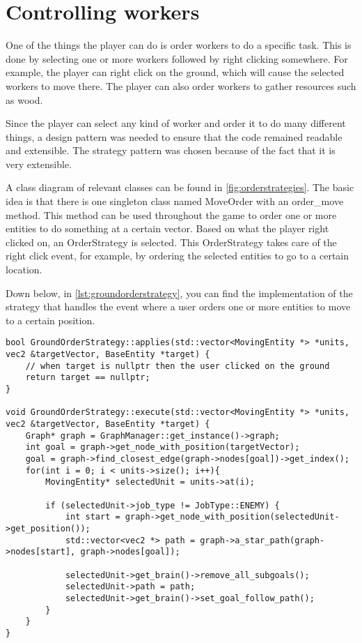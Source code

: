 \section{Controlling workers}

One of the things the player can do is order workers to do a specific task.
This is done by selecting one or more workers followed by right clicking
somewhere. For example, the player can right click on the ground, which will
cause the selected workers to move there. The player can also order workers
to gather resources such as wood.

Since the player can select any kind of worker and order it to do many
different things, a design pattern was needed to ensure that the code
remained readable and extensible. The strategy pattern was chosen because of
the fact that it is very extensible.

A class diagram of relevant classes can be found in
\cref{fig:orderstrategies}. The basic idea is that there is one singleton
class named MoveOrder with an order\_move method. This method can be used
throughout the game to order one or more entities to do something at a
certain vector. Based on what the player right clicked on, an OrderStrategy
is selected. This OrderStrategy takes care of the right click event, for
example, by ordering the selected entities to go to a certain location.

Down below, in \cref{lst:groundorderstrategy}, you can find the implementation 
of the strategy that handles the event where a user orders one or more entities
to move to a certain position.
\\
\begin{lstlisting}[caption={GroundOrderStrategy implementation.},
label={lst:groundorderstrategy}]
bool GroundOrderStrategy::applies(std::vector<MovingEntity *> *units, vec2 &targetVector, BaseEntity *target) {
    // when target is nullptr then the user clicked on the ground
    return target == nullptr;
}

void GroundOrderStrategy::execute(std::vector<MovingEntity *> *units, vec2 &targetVector, BaseEntity *target) {
    Graph* graph = GraphManager::get_instance()->graph;
    int goal = graph->get_node_with_position(targetVector);
    goal = graph->find_closest_edge(graph->nodes[goal])->get_index();
    for(int i = 0; i < units->size(); i++){
        MovingEntity* selectedUnit = units->at(i);

        if (selectedUnit->job_type != JobType::ENEMY) {
            int start = graph->get_node_with_position(selectedUnit->get_position());
            std::vector<vec2 *> path = graph->a_star_path(graph->nodes[start], graph->nodes[goal]);

            selectedUnit->get_brain()->remove_all_subgoals();
            selectedUnit->path = path;
            selectedUnit->get_brain()->set_goal_follow_path();
        }
    }
}
\end{lstlisting}
